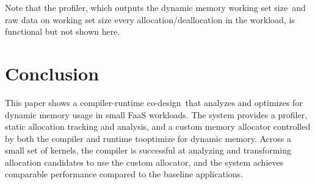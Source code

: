 \documentclass{article}
\def\crcd{compiler-runtime co-design}
\def\DWS{dynamic memory working set size}
\begin{document}
Note that the profiler, which outputs the \DWS\ and raw data on working set size 
every allocation/deallocation in the workload, is functional but not shown here. 

\section{Conclusion}
This paper shows a \crcd\ that analyzes and optimizes for dynamic memory usage in 
small FaaS workloads. The system provides a profiler, static allocation tracking and 
analysis, and a custom memory allocator controlled by both the compiler and runtime
tooptimize for dynamic memory. Across a small set of kernels, the compiler is 
successful at analyzing and transforming allocation candidates to use the custom
allocator, and the system achieves comparable performance compared to the baseline 
applications.



\end{document}
